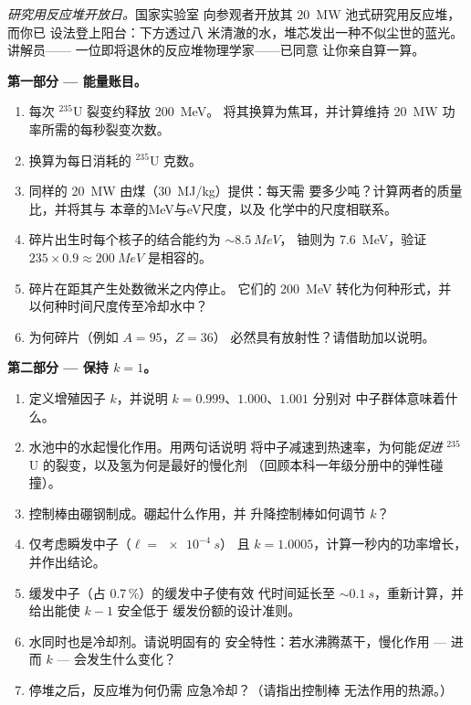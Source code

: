 \begin{problem}\label{pb:b3:nuclear-physics:1}
\emph{研究用反应堆开放日。}国家实验室
向参观者开放其 \qty{20}{MW} 池式研究用反应堆，而你已
设法登上阳台：下方透过八
米清澈的水，堆芯发出一种不似尘世的蓝光。讲解员——
一位即将退休的反应堆物理学家——已同意
让你亲自算一算。

\medskip\noindent\textbf{第一部分 --- 能量账目。}

\begin{enumerate}
  \item 每次 $^{235}$U 裂变约释放 \qty{200}{MeV}。
        将其换算为焦耳，并计算维持
        \qty{20}{MW} 功率所需的每秒裂变次数。
  \item 换算为每日消耗的 $^{235}$U 克数。
  \item 同样的 \qty{20}{MW} 由煤（\qty{30}{MJ/kg}）提供：每天需
        要多少吨？计算两者的质量比，并将其与
        本章的\unit{MeV}与\unit{eV}尺度，以及
        化学中的尺度相联系。
  \item 碎片出生时每个核子的结合能约为 $\sim\qty{8.5}{MeV}$，
        铀则为 \qty{7.6}{MeV}，验证
        $235\times0.9 \approx \qty{200}{MeV}$ 是相容的。
  \item 碎片在距其产生处数微米之内停止。
        它们的 \qty{200}{MeV} 转化为何种形式，并
        以何种时间尺度传至冷却水中？
  \item 为何碎片（例如 $A = 95$，$Z = 36$）
        必然具有放射性？请借助加以说明。
\end{enumerate}

\medskip\noindent\textbf{第二部分 --- 保持 $k = 1$。}

\begin{enumerate}[resume]
  \item 定义增殖因子 $k$，并说明
        $k = 0.999$、$1.000$、$1.001$ 分别对
        中子群体意味着什么。
  \item 水池中的水起慢化作用。用两句话说明
        将中子减速到热速率，为何能\emph{促进}
        $^{235}$U 的裂变，以及氢为何是最好的慢化剂
        （回顾本科一年级分册中的弹性碰撞）。
  \item 控制棒由硼钢制成。硼起什么作用，并
        升降控制棒如何调节 $k$？
  \item 仅考虑瞬发中子（$\ell = \qty{e-4}{s}$）
        且 $k = 1.0005$，计算一秒内的功率增长，
        并作出结论。
  \item 缓发中子（占 0.7\,\%）的缓发中子使有效
        代时间延长至 $\sim\qty{0.1}{s}$，重新计算，并
        给出能使 $k - 1$ 安全低于
        缓发份额的设计准则。
  \item 水同时也是冷却剂。请说明固有的
        安全特性：若水沸腾蒸干，慢化作用 --- 进而
        $k$ --- 会发生什么变化？
  \item 停堆之后，反应堆为何仍需
        应急冷却？（请指出控制棒
        无法作用的热源。）
\end{enumerate}


\end{problem}

